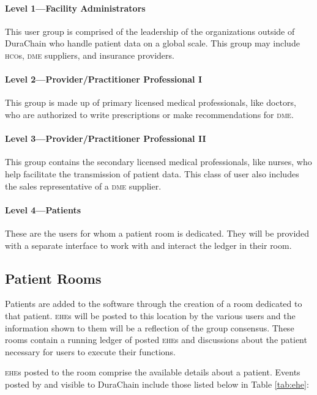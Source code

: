 \paragraph{Level 1---Facility Administrators}
This user group is comprised of the leadership of the organizations outside of DuraChain who handle patient data on a global scale. This group may include \textsc{hco}s, \textsc{dme} suppliers, and insurance providers.%

\paragraph{Level 2---Provider/Practitioner Professional I}
This group is made up of primary licensed medical professionals, like doctors, who are authorized to write prescriptions or make recommendations for \textsc{dme}.%

\paragraph{Level 3---Provider/Practitioner Professional II}
This group contains the secondary licensed medical professionals, like nurses, who help facilitate the transmission of patient data. This class of user also includes the sales representative of a \textsc{dme} supplier.%

\paragraph{Level 4---Patients}
These are the users for whom a patient room is dedicated. They will be provided with a separate interface to work with and interact the ledger in their room.%

\subsection{Patient Rooms}
Patients are added to the software through the creation of a room dedicated to that patient. \textsc{ehe}s will be posted to this location by the various users and the information shown to them will be a reflection of the group consensus. These rooms contain a running ledger of posted \textsc{ehe}s and discussions about the patient necessary for users to execute their functions.%

\textsc{ehe}s posted to the room comprise the available details about a patient. Events posted by and visible to DuraChain include those listed below in Table \ref{tab:ehe}:%



